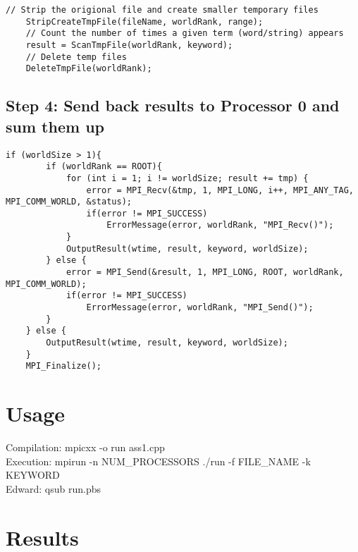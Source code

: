 \documentclass[a4paper,12pt]{article}
\theoremstyle{mytheor}
\begin{document}
\begin{lstlisting}[label={list:second},caption=Main searching loop]
	// Strip the origional file and create smaller temporary files
	StripCreateTmpFile(fileName, worldRank, range);
	// Count the number of times a given term (word/string) appears
	result = ScanTmpFile(worldRank, keyword);
	// Delete temp files
	DeleteTmpFile(worldRank);
\end{lstlisting}


\subsection*{Step 4: Send back results to Processor 0 and sum them up}
\begin{lstlisting}[label={list:second},caption=Main searching loop]
	if (worldSize > 1){
		if (worldRank == ROOT){
			for (int i = 1; i != worldSize; result += tmp) {
				error = MPI_Recv(&tmp, 1, MPI_LONG, i++, MPI_ANY_TAG, MPI_COMM_WORLD, &status);
				if(error != MPI_SUCCESS)
					ErrorMessage(error, worldRank, "MPI_Recv()");
			}
			OutputResult(wtime, result, keyword, worldSize);
		} else {
			error = MPI_Send(&result, 1, MPI_LONG, ROOT, worldRank, MPI_COMM_WORLD);
			if(error != MPI_SUCCESS)
				ErrorMessage(error, worldRank, "MPI_Send()");
		}
	} else {
		OutputResult(wtime, result, keyword, worldSize);
	}
	MPI_Finalize();
\end{lstlisting}
\section*{Usage}

Compilation:  mpicxx -o run  ass1.cpp \\
Execution: mpirun -n NUM\_PROCESSORS ./run -f FILE\_NAME -k KEYWORD\\
Edward: qsub run.pbs
\section*{Results}
\end{document}
